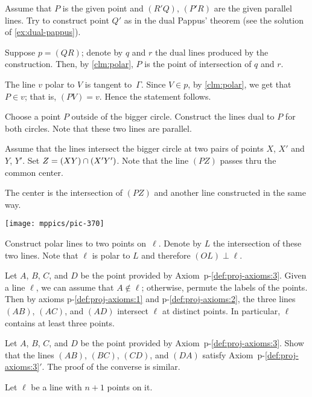 \begin{multicols}{2}
 Assume that $P$ is the given point and $(R'Q)$, $(P'R)$ are the given parallel lines.
Try to construct point $Q'$ as in the dual Pappus' theorem (see the solution of \ref{ex:dual-pappus}).

 Suppose $p=(QR)$; denote by $q$ and $r$ the dual lines produced by the construction.
Then, by \ref{clm:polar}, $P$ is the point of intersection of $q$ and $r$.

The line $v$ polar to $V$ is tangent to~$\Gamma$.
Since $V\in p$, by \ref{clm:polar}, we get that $P\in v$;
that is, $(PV)=v$.
Hence the statement follows.



Choose a point $P$ outside of the bigger circle.
Construct the lines dual to $P$ for both circles.
Note that these two lines are parallel. 

Assume that the lines intersect the bigger circle at two pairs of points $X$, $X'$ and $Y$, $Y'$.
Set $Z\z=(XY)\cap (X'Y')$.
Note that the line $(PZ)$ passes thru the common center.

The center is the intersection of $(PZ)$ and another line constructed in the same way.

\begin{Figure}
\vskip-0mm
\centering
\texttt{[image: mppics/pic-370]}
\vskip-6mm
\end{Figure} 

Construct polar lines to two points on~$\ell$.
Denote by $L$ the intersection of these two lines.
Note that $\ell$ is polar to $L$ and therefore $(OL)\perp \ell$.

Let $A$, $B$, $C$, and $D$ 
be the point provided by Axiom~p-\ref{def:proj-axioms:3}.
Given a line $\ell$, we can assume that $A\notin \ell$; 
otherwise, permute the labels of the points.
Then by axioms p-\ref{def:proj-axioms:1} and p-\ref{def:proj-axioms:2},
the three lines $(AB)$, $(AC)$, and $(AD)$ intersect $\ell$ at distinct points.
In particular, $\ell$ contains at least three points. 

Let $A$, $B$, $C$, and $D$ 
be the point provided by Axiom~p-\ref{def:proj-axioms:3}.
Show that the lines $(AB)$, $(BC)$, $(CD)$, and $(DA)$
satisfy Axiom~p-\ref{def:proj-axioms:3}$'$.
The proof of the converse is similar.

Let $\ell$ be a line with $n+1$ points on it.


\end{multicols}
